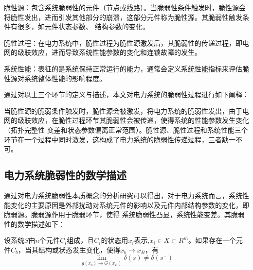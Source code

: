 脆性源：包含系统脆弱性的元件（节点或线路）。当脆弱性条件触发时，脆性源会将脆性发出，进而引发其他部分的崩溃，这部分元件称为脆性源。其脆弱性触发条件有很多，如元件状态参数、
结构参数的变化。

脆性过程：在电力系统中，脆性过程为脆性源激发后，其脆弱性的传递过程，即电网的级联效应，进而导致系统性能参数的变化和连锁故障的发生。

系统性能：表征的是系统保持正常运行的能力，通常会定义系统性能指标来评估脆性源对系统整体性能的影响程度。

通过对以上三个环节的定义与描述，本文对电力系统的脆弱性过程进行如下阐释：

当脆性源的脆弱条件触发时，脆性源会被激发，将电力系统的脆弱性发出，由于电网的级联效应，在脆性过程环节其脆弱性会被传递，使得系统的性能参数发生变化（拓扑完整性
变差和状态参数偏离正常范围）。脆性源、脆性过程和系统性能三个环节在一个过程中同时激发，这构成了电力系统的脆弱性传递过程，三者缺一不可。







\subsection{电力系统脆弱性的数学描述}
\label{sec:describtion}

通过对电力系统脆弱性本质概念的分析研究可以得出，对于电力系统而言，系统性能变化的主要原因是外部扰动对系统元件的影响以及元件内部结构参数的变化，即脆弱源。脆弱源作用于脆弱环节，使得
系统脆弱性凸显，系统性能变差。其脆弱性的数学描述如下：

设系统$S$由$n$个元件$C_i$组成，且$C_i$的状态用$x_i$表示,$x_i \in X \subset R^m$。如果存在一个元件$C_b$，当其结构或状态发生变化，使得$x_b \to x_B$，有
\begin{equation}
  \label{equ:chap3:math1}
  \lim _{g\left(x_{b}\right) \rightarrow G\left(x_{B}\right)} \delta(s) \neq \delta\left(s^{-}\right)
  \end{equation}
 
